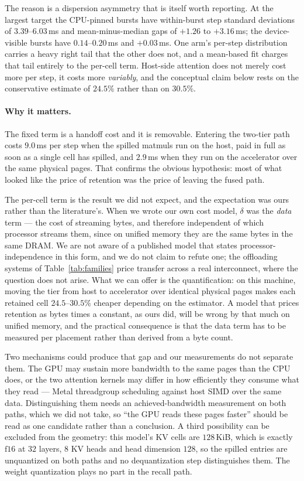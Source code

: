\documentclass[manuscript,anonymous,review]{acmart}
\begin{document}
The reason is a dispersion asymmetry that is itself worth reporting. At
the largest target the CPU-pinned bursts have within-burst step
standard deviations of $3.39$--$6.03$\,ms and mean-minus-median gaps of
$+1.26$ to $+3.16$\,ms; the device-visible bursts have $0.14$--$0.20$\,ms
and $+0.03$\,ms. One arm's per-step distribution carries a heavy right
tail that the other does not, and a mean-based fit charges that tail
entirely to the per-cell term. Host-side attention does not merely cost
more per step, it costs more \emph{variably}, and the conceptual claim
below rests on the conservative estimate of $24.5\%$ rather than on
$30.5\%$.

\paragraph{Why it matters.} The fixed term is a handoff cost and it is
removable. Entering the two-tier path costs $9.0$\,ms per step when
the spilled matmuls run on the host, paid in full as soon as a single
cell has spilled, and $2.9$\,ms when they run on the accelerator over
the same physical pages. That confirms the obvious hypothesis: most of
what looked like the price of retention was the price of leaving the
fused path.

The per-cell term is the result we did not expect, and the expectation
was ours rather than the literature's. When we wrote our own cost
model, $\delta$ was the \emph{data} term --- the cost of streaming
bytes, and therefore independent of which processor streams them, since
on unified memory they are the same bytes in the same DRAM. We are not
aware of a published model that states processor-independence in this
form, and we do not claim to refute one; the offloading systems of
Table~\ref{tab:families} price transfer across a real interconnect,
where the question does not arise. What we can offer is the
quantification: on this machine, moving the tier from host to
accelerator over identical physical pages makes each retained cell
$24.5$--$30.5\%$ cheaper depending on the estimator. A model that
prices retention as bytes times a constant, as ours did, will be wrong
by that much on unified memory, and the practical consequence is that
the data term has to be measured per placement rather than derived from
a byte count.

Two mechanisms could produce that gap and our measurements do not
separate them. The GPU may sustain more bandwidth to the same pages
than the CPU does, or the two attention kernels may differ in how
efficiently they consume what they read --- Metal threadgroup
scheduling against host SIMD over the same data. Distinguishing them
needs an achieved-bandwidth measurement on both paths, which we did not
take, so ``the GPU reads these pages faster'' should be read as one
candidate rather than a conclusion. A third possibility can be
excluded from the geometry: this model's KV cells are $128$\,KiB, which
is exactly $\text{f16}$ at $32$ layers, $8$ KV heads and head dimension
$128$, so the spilled entries are unquantized on both paths and no
dequantization step distinguishes them. The weight quantization plays
no part in the recall path.
\end{document}
